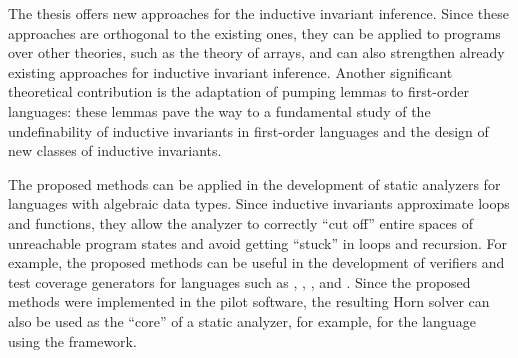 {\influenceTh}
The thesis offers new approaches for the inductive invariant inference. Since these approaches are orthogonal to the existing ones, they can be applied to programs over other theories, such as the theory of arrays, and can also strengthen already existing approaches for inductive invariant inference. Another significant theoretical contribution is the adaptation of pumping lemmas to first-order languages: these lemmas pave the way to a fundamental study of the undefinability of inductive invariants in first-order languages and the design of new classes of inductive invariants.

{\influencePr}
The proposed methods can be applied in the development of static analyzers for languages with algebraic data types. Since inductive invariants approximate loops and functions, they allow the analyzer to correctly ``cut off'' entire spaces of unreachable program states and avoid getting ``stuck'' in loops and recursion.
For example, the proposed methods can be useful in the development of verifiers and test coverage generators for languages such as \rust{}, \scala{}, \solidity{}, \haskell{} and \ocaml{}.
Since the proposed methods were implemented in the pilot software, the resulting Horn solver can also be used as the ``core'' of a static analyzer, for example, for the \rust{} language using the \rustHorn{} framework.


